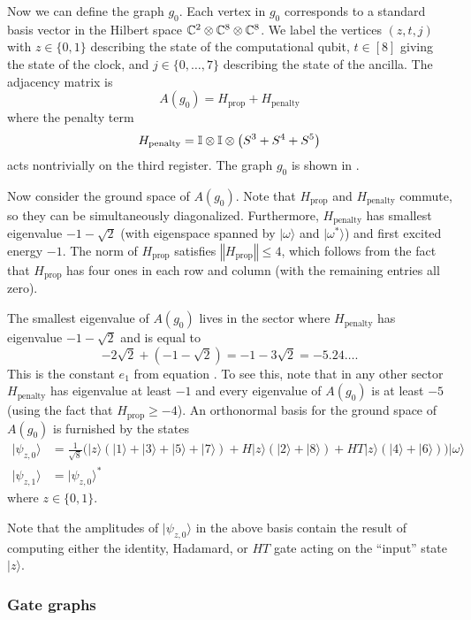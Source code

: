 \documentclass[../thesis-main/thesis-main]{subfiles}
\begin{document}
Now we can define the graph $g_{0}$. Each vertex in $g_0$ corresponds to a standard basis vector in the Hilbert space $\mathbb{C}^{2}\otimes\mathbb{C}^{8}\otimes\mathbb{C}^{8}$. We label the vertices $(z,t,j)$ with $z\in\{0,1\}$ describing the state of the computational qubit, $t\in[8]$ giving the state of the clock, and $j\in\{0,\ldots,7\}$ describing the state of the ancilla. The adjacency matrix is
\[
A(g_{0})=H_{\text{prop}}+H_{\text{penalty}}
\]
where the penalty term
\[
H_{\text{penalty}}=\mathbb{I}\otimes\mathbb{I}\otimes\left(S^{3}+S^{4}+S^{5}\right)
\]
acts nontrivially on the third register. The graph $g_{0}$ is shown in .

Now consider the ground space of $A(g_{0})$. Note that $H_{\text{prop}}$ and $H_{\text{penalty}}$ commute, so they can be simultaneously diagonalized. Furthermore, $H_{\text{penalty}}$ has smallest eigenvalue $-1-\sqrt{2}$ (with eigenspace spanned by $|\omega\rangle$ and $|\omega^*\rangle$) and first excited energy $-1$. The norm of $H_{\text{prop}}$ satisfies $\left\Vert H_{\text{prop}}\right\Vert \leq4$, which follows from the fact that $H_{\text{prop}}$ has four ones in each row and column (with the remaining entries all zero).

The smallest eigenvalue of $A(g_{0})$ lives in the sector where $H_{\text{penalty}}$
has eigenvalue $-1-\sqrt{2}$ and is equal to 
\begin{equation}
  -2\sqrt{2}+(-1-\sqrt{2})=-1-3\sqrt{2}=-5.24\ldots.\label{eq:e_1_definition}
\end{equation}
This is the constant $e_{1}$ from equation . To see this, note that in any other sector $H_{\text{penalty}}$ has eigenvalue at least $-1$ and every eigenvalue of $A(g_{0})$ is at least $-5$ (using the fact that $H_{\text{prop}}\geq-4$). An orthonormal basis for the ground space of $A(g_{0})$ is furnished by the states
\begin{align}
|\psi_{z,0}\rangle & =\frac{1}{\sqrt{8}}\big(|z\rangle(|1\rangle+|3\rangle+|5\rangle+|7\rangle)+H|z\rangle(|2\rangle+|8\rangle)+HT|z\rangle(|4\rangle+|6\rangle)\big)|\omega\rangle\label{eq:psi0m}\\
|\psi_{z,1}\rangle & =|\psi_{z,0}\rangle^{*}\label{eq:psi1m}
\end{align}
where $z\in \{0,1\}$.

Note that the amplitudes of $|\psi_{z,0}\rangle$ in the above basis contain the result of computing either the identity, Hadamard, or $HT$ gate acting on the ``input'' state $|z\rangle$.


\subsubsection{Gate graphs}
\end{document}
